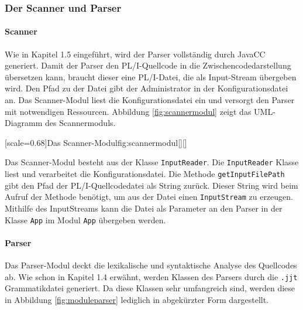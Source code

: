 \subsubsection{Der Scanner und Parser}
\paragraph*{Scanner}
Wie in Kapitel 1.5 eingeführt, wird der Parser vollständig durch JavaCC generiert. 
Damit der Parser den PL/I-Quellcode in die Zwischencodedarstellung übersetzen kann,
braucht dieser eine PL/I-Datei, die als Input-Stream übergeben wird.
Den Pfad zu der Datei gibt der Administrator in der Konfigurationsdatei an.
Das Scanner-Modul liest die Konfigurationsdatei ein und versorgt den Parser mit notwendigen Ressourcen.
Abbildung \ref{fig:scannermodul} zeigt das UML-Diagramm des Scannermoduls.

[scale=0.68]{Das Scanner-Modul}{fig:scannermodul}[][]

Das Scanner-Modul besteht aus der Klasse \verb+InputReader+. 
Die \verb+InputReader+ Klasse liest und verarbeitet die Konfigurationsdatei. Die Methode \verb+getInputFilePath+ gibt den Pfad der PL/I-Quellcodedatei als String zurück.
Dieser String wird beim Aufruf der  Methode benötigt, um aus der Datei einen \verb+InputStream+ zu erzeugen.
Mithilfe des InputStreams kann die Datei als Parameter an den Parser in der Klasse \verb+App+ im Modul \verb+App+
übergeben werden. 


\paragraph*{Parser}
Das Parser-Modul deckt die lexikalische und syntaktische Analyse des Quellcodes ab. Wie schon in Kapitel 1.4 erwähnt, werden Klassen des Parsers durch die \verb+.jjt+ Grammatikdatei generiert. Da diese Klassen sehr umfangreich sind, werden diese in Abbildung \ref{fig:moduleparser} lediglich in abgekürzter Form dargestellt. 

